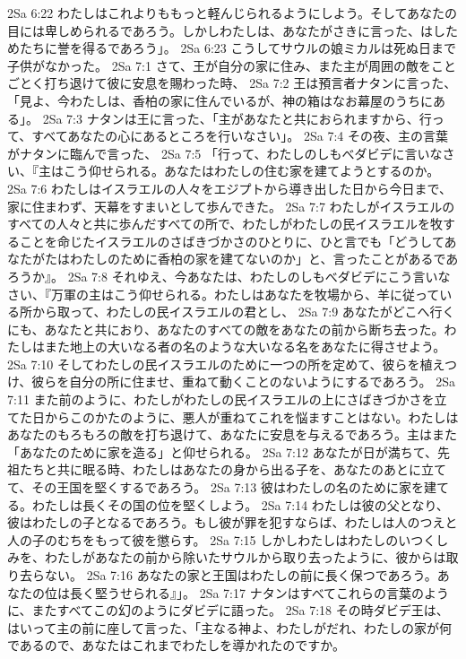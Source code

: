 2Sa 6:22  わたしはこれよりももっと軽んじられるようにしよう。そしてあなたの目には卑しめられるであろう。しかしわたしは、あなたがさきに言った、はしためたちに誉を得るであろう」。
2Sa 6:23  こうしてサウルの娘ミカルは死ぬ日まで子供がなかった。
2Sa 7:1  さて、王が自分の家に住み、また主が周囲の敵をことごとく打ち退けて彼に安息を賜わった時、
2Sa 7:2  王は預言者ナタンに言った、「見よ、今わたしは、香柏の家に住んでいるが、神の箱はなお幕屋のうちにある」。
2Sa 7:3  ナタンは王に言った、「主があなたと共におられますから、行って、すべてあなたの心にあるところを行いなさい」。
2Sa 7:4  その夜、主の言葉がナタンに臨んで言った、
2Sa 7:5  「行って、わたしのしもべダビデに言いなさい、『主はこう仰せられる。あなたはわたしの住む家を建てようとするのか。
2Sa 7:6  わたしはイスラエルの人々をエジプトから導き出した日から今日まで、家に住まわず、天幕をすまいとして歩んできた。
2Sa 7:7  わたしがイスラエルのすべての人々と共に歩んだすべての所で、わたしがわたしの民イスラエルを牧することを命じたイスラエルのさばきづかさのひとりに、ひと言でも「どうしてあなたがたはわたしのために香柏の家を建てないのか」と、言ったことがあるであろうか』。
2Sa 7:8  それゆえ、今あなたは、わたしのしもべダビデにこう言いなさい、『万軍の主はこう仰せられる。わたしはあなたを牧場から、羊に従っている所から取って、わたしの民イスラエルの君とし、
2Sa 7:9  あなたがどこへ行くにも、あなたと共におり、あなたのすべての敵をあなたの前から断ち去った。わたしはまた地上の大いなる者の名のような大いなる名をあなたに得させよう。
2Sa 7:10  そしてわたしの民イスラエルのために一つの所を定めて、彼らを植えつけ、彼らを自分の所に住ませ、重ねて動くことのないようにするであろう。
2Sa 7:11  また前のように、わたしがわたしの民イスラエルの上にさばきづかさを立てた日からこのかたのように、悪人が重ねてこれを悩ますことはない。わたしはあなたのもろもろの敵を打ち退けて、あなたに安息を与えるであろう。主はまた「あなたのために家を造る」と仰せられる。
2Sa 7:12  あなたが日が満ちて、先祖たちと共に眠る時、わたしはあなたの身から出る子を、あなたのあとに立てて、その王国を堅くするであろう。
2Sa 7:13  彼はわたしの名のために家を建てる。わたしは長くその国の位を堅くしよう。
2Sa 7:14  わたしは彼の父となり、彼はわたしの子となるであろう。もし彼が罪を犯すならば、わたしは人のつえと人の子のむちをもって彼を懲らす。
2Sa 7:15  しかしわたしはわたしのいつくしみを、わたしがあなたの前から除いたサウルから取り去ったように、彼からは取り去らない。
2Sa 7:16  あなたの家と王国はわたしの前に長く保つであろう。あなたの位は長く堅うせられる』」。
2Sa 7:17  ナタンはすべてこれらの言葉のように、またすべてこの幻のようにダビデに語った。
2Sa 7:18  その時ダビデ王は、はいって主の前に座して言った、「主なる神よ、わたしがだれ、わたしの家が何であるので、あなたはこれまでわたしを導かれたのですか。
